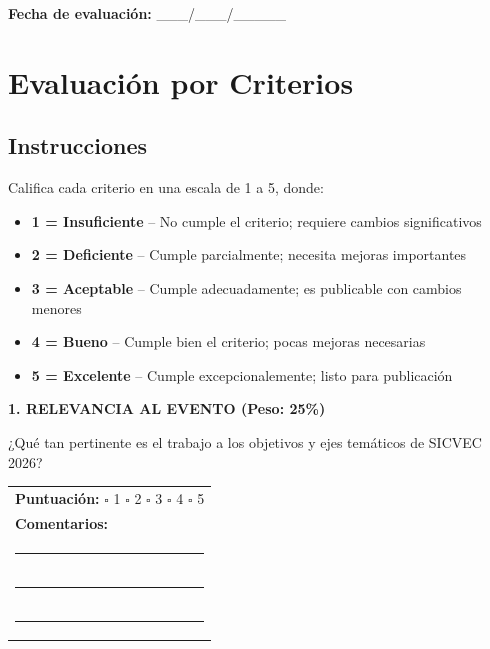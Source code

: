 \documentclass[12pt,a4paper]{article}
\begin{document}
\noindent
\textbf{Fecha de evaluación:} \_\_\_/\_\_\_/\_\_\_\_\_

\vspace{1cm}

\section{Evaluación por Criterios}

\subsection*{Instrucciones}
Califica cada criterio en una escala de 1 a 5, donde:
\begin{itemize}[label={\textcolor{verdeosc}{\textbullet}}]
  \item \textbf{1 = Insuficiente} -- No cumple el criterio; requiere cambios significativos
  \item \textbf{2 = Deficiente} -- Cumple parcialmente; necesita mejoras importantes
  \item \textbf{3 = Aceptable} -- Cumple adecuadamente; es publicable con cambios menores
  \item \textbf{4 = Bueno} -- Cumple bien el criterio; pocas mejoras necesarias
  \item \textbf{5 = Excelente} -- Cumple excepcionalemente; listo para publicación
\end{itemize}

\vspace{0.8cm}

\begin{tcolorbox}[enhanced, colback=verdeclaro, colframe=verdeosc, boxrule=1.5pt, left=8pt, right=8pt, top=10pt, bottom=10pt]

\noindent\textbf{1. RELEVANCIA AL EVENTO (Peso: 25\%)}

¿Qué tan pertinente es el trabajo a los objetivos y ejes temáticos de SICVEC 2026?

\vspace{0.3cm}

\noindent
\begin{tabular}{p{14cm}}
\textbf{Puntuación:} \hspace{1cm}
$\square$ 1 \quad $\square$ 2 \quad $\square$ 3 \quad $\square$ 4 \quad $\square$ 5 \\[0.3cm]
\textbf{Comentarios:} \\
\rule{14cm}{0.4pt} \\
\rule{14cm}{0.4pt} \\
\rule{14cm}{0.4pt} \\
\end{tabular}

\end{tcolorbox}
\end{document}
